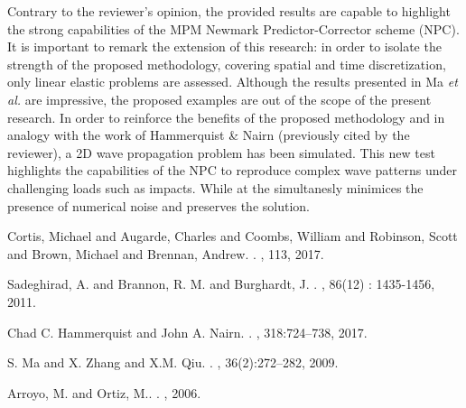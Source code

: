 \documentclass[12pt]{article}
\begin{document}
Contrary to the reviewer's opinion, the provided results are capable to highlight the strong capabilities of the MPM Newmark Predictor-Corrector scheme (NPC). It is important to remark the extension of this research: in order to isolate the strength of the proposed methodology, covering spatial and time discretization, only linear elastic problems are assessed. Although the results presented in Ma {\it et al.} \cite{MA2009272} are impressive, the proposed examples are out of the scope of the present research. In order to reinforce the benefits of the proposed methodology and in analogy with the work of Hammerquist \& Nairn \cite{HAMMERQUIST2017724} (previously cited by the reviewer), a 2D wave propagation problem has been simulated. This new test highlights the capabilities of the NPC to reproduce complex wave patterns under challenging loads such as impacts. While at the simultanesly minimices the presence of numerical noise and preserves the solution.


\begin{thebibliography}{10}

Cortis, Michael and Augarde, Charles and Coombs, William and Robinson, Scott and Brown, Michael and Brennan, Andrew.
.
, 113, 2017.

Sadeghirad, A. and Brannon, R. M. and Burghardt, J.
.
, 86(12) : 1435-1456, 2011.


Chad C. Hammerquist and John A. Nairn.
.
,  318:724--738, 2017.


S. Ma and X. Zhang and X.M. Qiu.
.
, 36(2):272--282, 2009.

Arroyo, M. and Ortiz, M..
.
,  2006.

\end{thebibliography}
\end{document}
